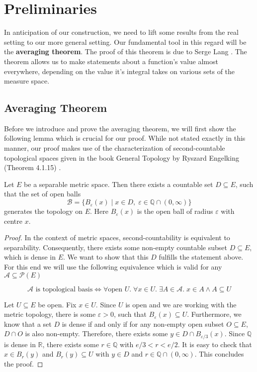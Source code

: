 \section{Preliminaries}

In anticipation of our construction, we need to lift some results from the real setting to our more general setting. Our fundamental tool in this regard will be the \textbf{averaging theorem}. The proof of this theorem is due to Serge Lang \cite{Lang_1993}. The theorem allows us to make statements about a function's value almost everywhere, depending on the value it's integral takes on various sets of the measure space.

\subsection{Averaging Theorem}

Before we introduce and prove the averaging theorem, we will first show the following lemma which is crucial for our proof. While not stated exactly in this manner, our proof makes use of the characterization of second-countable topological spaces given in the book General Topology by Ryszard Engelking (Theorem 4.1.15) \cite{engelking_1989}.

\begin{lemma}
Let $E$ be a separable metric space. Then there exists a countable set $D \subseteq E$, such that the set of open balls
\[
	\mathcal{B} = \{ B_\varepsilon(x) \; \vert \; x \in D, \; \varepsilon \in \mathbb{Q} \cap (0, \infty) \}
\]
generates the topology on $E$. Here $B_\varepsilon(x)$ is the open ball of radius $\varepsilon$ with centre $x$.
\end{lemma}

\begin{proof}
In the context of metric spaces, second-countability is equivalent to separability. Consequently, there exists some non-empty countable subset $D \subseteq E$, which is dense in $E$. We want to show that this $D$ fulfills the statement above. For this end we will use the following equivalence which is valid for any $\mathcal{A} \subseteq \mathcal{P}(E)$

\[
	\mathcal{A} \textrm{ is topological basis} \Longleftrightarrow \forall \textrm{open } U.\; \forall x \in U.\; \exists A \in \mathcal{A}.\; x \in A \wedge A \subseteq U
\]

Let $U \subseteq E$ be open. Fix $x \in U$. Since $U$ is open and we are working with the metric topology, there is some $\varepsilon > 0$, such that $B_\varepsilon(x) \subseteq U$. Furthermore, we know that a set $D$ is dense if and only if for any non-empty open subset $O \subseteq E$, $D \cap O$ is also non-empty. Therefore, there exists some $y \in D \cap B_{\varepsilon/3}(x)$. Since $\mathbb{Q}$ is dense in $\mathbb{R}$, there exists some $r \in \mathbb{Q}$ with $e/3 < r < e/2$. It is easy to check that $x \in B_r(y)$ and $B_r(y) \subseteq U$ with $y \in D$ and $r \in \mathbb{Q} \cap (0, \infty)$. This concludes the proof.
\end{proof}

